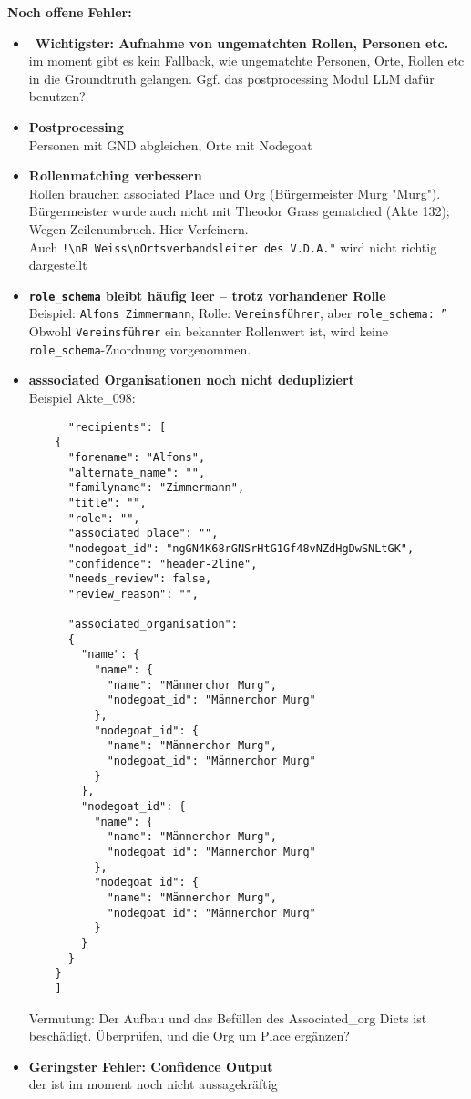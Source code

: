 \documentclass{article}
\begin{document}
\noindent\textbf{Noch offene Fehler:}
\begin{itemize}
    \item\faExclamationTriangle\  \textbf{Wichtigster: Aufnahme von ungematchten Rollen, Personen etc.} \\ im moment gibt es kein Fallback, wie ungematchte Personen, Orte, Rollen etc in die Groundtruth gelangen. Ggf. das postprocessing Modul LLM dafür benutzen?
    \item \textbf{Postprocessing} \\ Personen mit GND abgleichen, Orte mit Nodegoat
    \item \textbf{Rollenmatching verbessern}\\ Rollen brauchen associated Place und Org (Bürgermeister Murg \textrightarrow{} "Murg"). Bürgermeister wurde auch nicht mit Theodor Grass gematched (Akte 132); Wegen Zeilenumbruch. Hier Verfeinern. \\Auch \verb|!\nR Weiss\nOrtsverbandsleiter des V.D.A."| wird nicht richtig dargestellt
    \item \textbf{\texttt{role\_schema} bleibt häufig leer – trotz vorhandener Rolle}\\Beispiel: \texttt{Alfons Zimmermann}, Rolle: \texttt{Vereinsführer}, aber \texttt{role\_schema: ''}\\Obwohl \texttt{Vereinsführer} ein bekannter Rollenwert ist, wird keine \texttt{role\_schema}-Zuordnung vorgenommen.
    \item \textbf{asssociated Organisationen noch nicht dedupliziert}\\Beispiel Akte\_098:
      \begin{verbatim}
      "recipients": [
    {
      "forename": "Alfons",
      "alternate_name": "",
      "familyname": "Zimmermann",
      "title": "",
      "role": "",
      "associated_place": "",
      "nodegoat_id": "ngGN4K68rGNSrHtG1Gf48vNZdHgDwSNLtGK",
      "confidence": "header-2line",
      "needs_review": false,
      "review_reason": "",

      "associated_organisation": 
      {
        "name": {
          "name": {
            "name": "Männerchor Murg",
            "nodegoat_id": "Männerchor Murg"
          },
          "nodegoat_id": {
            "name": "Männerchor Murg",
            "nodegoat_id": "Männerchor Murg"
          }
        },
        "nodegoat_id": {
          "name": {
            "name": "Männerchor Murg",
            "nodegoat_id": "Männerchor Murg"
          },
          "nodegoat_id": {
            "name": "Männerchor Murg",
            "nodegoat_id": "Männerchor Murg"
          }
        }
      }
    }
    ]

    \end{verbatim}
    Vermutung: Der Aufbau und das Befüllen des Associated\_org Dicts ist beschädigt. Überprüfen, und die Org um Place ergänzen?
     \item \textbf{Geringster Fehler: Confidence Output}\\ der ist im moment noch nicht aussagekräftig
    


\end{itemize}    
\end{document}
